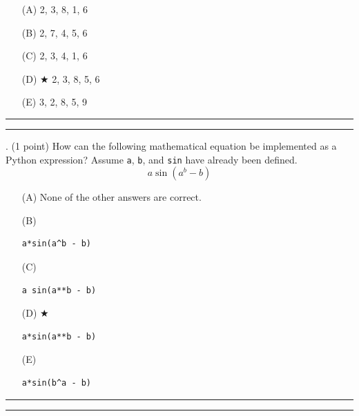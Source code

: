 \documentclass{article}
\begin{document}
\begin{enumerate}
\item[(A)]
2, 3, 8, 1, 6

\item[(B)]
2, 7, 4, 5, 6

\item[(C)]
2, 3, 4, 1, 6

\item[(D)] $\bigstar$ 
2, 3, 8, 5, 6

\item[(E)]
3, 2, 8, 5, 9

\end{enumerate}

\vspace*{2em}
\hrule
\vspace{2em}

\vspace{2em}
\hrule height 2pt


\newpage
{}. (1 point)
How can the following mathematical equation be implemented as a Python expression? Assume \verb|a|, \verb|b|, and \verb|sin| have already been defined.
$$a \sin(a^b - b)$$


\begin{enumerate}
\item[(A)]
None of the other answers are correct.

\item[(B)]
\begin{verbatim}a*sin(a^b - b)\end{verbatim}

\item[(C)]
\begin{verbatim}a sin(a**b - b)\end{verbatim}

\item[(D)] $\bigstar$ 
\begin{verbatim}a*sin(a**b - b)\end{verbatim}

\item[(E)]
\begin{verbatim}a*sin(b^a - b)\end{verbatim}

\end{enumerate}

\vspace*{2em}
\hrule
\vspace{2em}

\vspace{2em}
\hrule height 2pt
\end{document}
